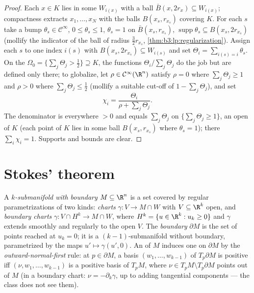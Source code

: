 \begin{proof}
Each $x \in K$ lies in some $W_{i(x)}$ with a  ball
$\bar B(x, 2r_x) \subseteq W_{i(x)}$; compactness extracts
$x_1, \dots, x_N$ with the balls $B(x_s, r_{x_s})$ covering
$K$. For each $s$ take a bump $\theta_s \in \mathcal
C^\infty$, $0 \leq \theta_s \leq 1$, $\theta_s = 1$ on
$\bar B(x_s, r_{x_s})$, $\operatorname{supp}\theta_s
\subseteq B(x_s, 2r_{x_s})$ (mollify the indicator of the
ball of radius $\frac32r_{x_s}$,
\cref{thm:b3:lp:regularization}). Assign each $s$ to one
index $i(s)$ with $B(x_s, 2r_{x_s}) \subseteq W_{i(s)}$ and
set $\Theta_i = \sum_{i(s) = i}\theta_s$. On the 
$\Omega_0 = \{\sum_j\Theta_j > \tfrac12\} \supseteq K$, the
functions $\Theta_i/\sum_j\Theta_j$ do the job but are
defined only there; to globalize, let $\rho \in \mathcal
C^\infty(\R^n)$ satisfy $\rho = 0$ where $\sum_j\Theta_j
\geq 1$ and $\rho > 0$ where $\sum_j\Theta_j \leq \tfrac12$
(mollify a suitable cut-off of $1 - \sum_j\Theta_j$), and
set
\[
\chi_i = \frac{\Theta_i}{\rho + \sum_j\Theta_j} .
\]
The denominator is everywhere $> 0$ and equals
$\sum_j\Theta_j$ on $\{\sum_j\Theta_j \geq 1\}$, an open
 of $K$ (each point of $K$ lies in some ball
$B(x_s, r_{x_s})$ where $\theta_s = 1$); there
$\sum_i\chi_i = 1$. Supports and bounds are clear.
\end{proof}

\section{Stokes' theorem}

\begin{definition}\label{def:b3:forms:boundary}
A \emph{$k$-submanifold with boundary} $M \subseteq \R^n$ is a set covered by regular
parametrizations of two kinds: \emph{ charts}
$\gamma\colon V \to M \cap W$ with $V \subseteq \R^k$ open,
and \emph{boundary charts} $\gamma\colon V \cap H^k \to M
\cap W$, where $H^k = \{u \in \R^k : u_k \geq 0\}$ and
$\gamma$ extends smoothly and regularly to the open $V$.
The \emph{boundary} $\partial M$ is the set of points
reached at $u_k = 0$; it is a $(k-1)$-submanifold without
boundary, parametrized by the maps $u' \mapsto \gamma(u',
0)$. An  of $M$ induces one on $\partial M$ by
the \emph{outward-normal-first} rule: at $p \in \partial M$,
a basis $(w_1, \dots, w_{k-1})$ of $T_p\partial M$ is
positive iff $(\nu, w_1, \dots, w_{k-1})$ is a positive
basis of $T_pM$, where $\nu \in T_pM \setminus T_p\partial M$
points out of $M$ (in a boundary chart: $\nu =
-\partial_k\gamma$, up to adding tangential components ---
the  class does not see them).
\end{definition}

